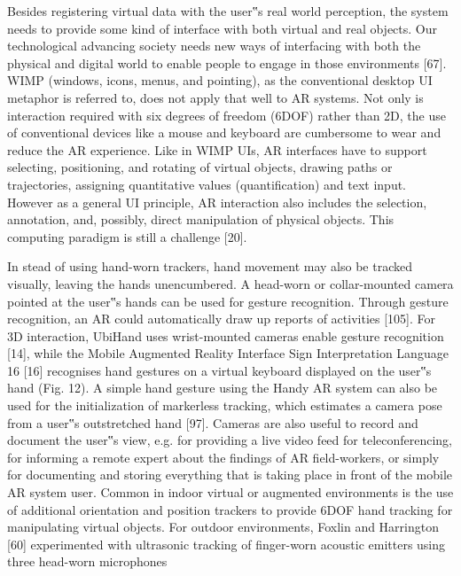 Besides registering virtual data with the user‟s real world
perception, the system needs to provide some kind of interface
with both virtual and real objects. Our technological
advancing society needs new ways of interfacing with both
the physical and digital world to enable people to engage in
those environments [67]. 
WIMP (windows, icons, menus, and pointing), as the
conventional desktop UI metaphor is referred to, does not
apply that well to AR systems. Not only is interaction required
with six degrees of freedom (6DOF) rather than 2D, the use of conventional devices like a mouse and keyboard
are cumbersome to wear and reduce the AR experience.
Like in WIMP UIs, AR interfaces have to support selecting,
positioning, and rotating of virtual objects, drawing
paths or trajectories, assigning quantitative values (quantification)
and text input. However as a general UI principle,
AR interaction also includes the selection, annotation, and,
possibly, direct manipulation of physical objects. This
computing paradigm is still a challenge [20].




In stead of using hand-worn trackers, hand movement may
also be tracked visually, leaving the hands unencumbered. A
head-worn or collar-mounted camera pointed at the user‟s
hands can be used for gesture recognition. Through gesture
recognition, an AR could automatically draw up reports of
activities [105]. For 3D interaction, UbiHand uses
wrist-mounted cameras enable gesture recognition [14],
while the Mobile Augmented Reality Interface Sign Interpretation Language 16 [16] recognises hand gestures on a
virtual keyboard displayed on the user‟s hand (Fig. 12). A
simple hand gesture using the Handy AR system can also be
used for the initialization of markerless tracking, which estimates
a camera pose from a user‟s outstretched hand [97].
Cameras are also useful to record and document the user‟s
view, e.g. for providing a live video feed for teleconferencing,
for informing a remote expert about the findings of AR
field-workers, or simply for documenting and storing everything
that is taking place in front of the mobile AR system
user.
Common in indoor virtual or augmented environments is
the use of additional orientation and position trackers to
provide 6DOF hand tracking for manipulating virtual objects.
For outdoor environments, Foxlin and Harrington [60] experimented
with ultrasonic tracking of finger-worn acoustic
emitters using three head-worn microphones




